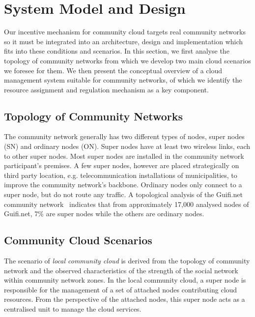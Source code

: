 

\section{System Model and Design}
\label{sec:design}

Our incentive mechanism for community cloud targets real community networks so it must be integrated into an architecture, design and implementation which fits into these conditions and scenarios.
In this section, we first analyse the topology of community networks from which we develop two main cloud scenarios we foresee for them.
We then present the conceptual overview of a cloud management system suitable for community networks, of which we identify the resource assignment and regulation mechanism as a key component.



\subsection{Topology of Community Networks}

The community network generally has two different types of nodes,  super nodes (SN) and ordinary nodes (ON). 
Super nodes have at least two wireless links, each to other super nodes.  
Most super nodes are installed in the community network participant's premises. 
A few super nodes, however are placed strategically on third party location, e.g. telecommunication installations of municipalities, to improve the community network's backbone.
Ordinary nodes only connect to a super node, but do not route any traffic. 
A topological analysis of the Guifi.net community network~\cite{Vega2012} indicates that from approximately 17,000 analysed nodes of Guifi.net, 7\% are super nodes while the others are ordinary nodes.



\subsection{Community Cloud Scenarios}

The scenario of \emph{local community cloud} is derived from the topology of community network and the observed characteristics of the strength of the social network within community network zones. 
In the local community cloud, a super node is responsible for the management of a set of attached nodes contributing cloud resources. 
From the perspective of the attached nodes, this super node acts as a centralised unit to manage the cloud services. 

